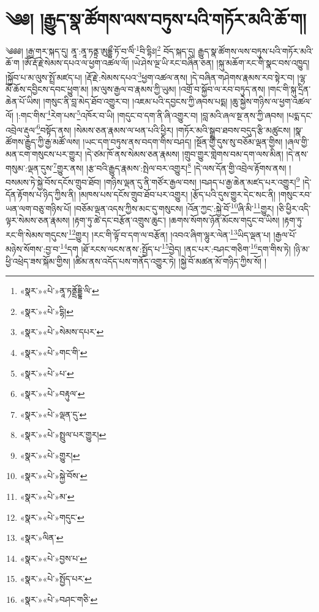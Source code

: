 \chapter{༄༅། །རྒྱུད་སྣ་ཚོགས་ལས་བཏུས་པའི་གཏོར་མའི་ཆོ་ག།}༄༅༅། །རྒྱ་གར་སྐད་དུ། ནཱ་:ནཱ་ཏནྟྲ་ཨུདྡྷྲྀ་ཏོ་བ་ལིཾ་\footnote{«སྣར་»«པེ་»ནཱ་ཏནྡྲོདྡྷི་ལི་}བི་དྷིཿ།\footnote{«སྣར་»«པེ་»དྷི།} བོད་སྐད་དུ། རྒྱུད་སྣ་ཚོགས་ལས་བཏུས་པའི་གཏོར་མའི་ཆོ་ག །ཨོཾ་རྡོ་རྗེ་སེམས་དཔའ་ལ་ཕྱག་འཚལ་ལོ། །ཡེ་ཤེས་ལྔ་ཡི་རང་བཞིན་ཅན། །སྐུ་མཆོག་རང་གི་སྣང་བས་འཁྱུད། །སྐྱོབ་པ་མ་ལུས་སྤྲོ་མཛད་པ། །རྡོ་རྗེ་:སེམས་དཔའ་\footnote{«སྣར་»«པེ་»སེམས་དཔར་}ཕྱག་འཚལ་ནས། །དེ་བཞིན་གཤེགས་རྣམས་རབ་སྟེར་བ། །ལྷ་མོ་ཆོས་དབྱིངས་དབང་ཕྱུག་མ། །མ་ལུས་རྒྱལ་བ་རྣམས་ཀྱི་ཡུམ། །འགྲོ་བ་སྐྱོབ་ལ་རབ་བཏུད་ནས། །གང་གི་སྐུ་དྲིན་ཆེན་པོ་ཡིས། །གསུང་ནི་བླ་མེད་ཐོབ་འགྱུར་བ། །འཇམ་པའི་དབྱངས་ཀྱི་ཞབས་པདྨ། །ཆུ་སྐྱེས་གཉིས་ལ་ཕྱག་འཚལ་ལོ། །:གང་གིས་\footnote{«སྣར་»«པེ་»གང་གི་}རེག་པས་\footnote{«སྣར་»«པེ་»པ་}འཁོར་བ་ཡི། །གདུང་བ་དག་ནི་ཞི་འགྱུར་བ། །བླ་མའི་ཞལ་སྔ་ནས་ཀྱི་ཞབས། །པདྨ་དང་འབྲེལ་རྡུལ་\footnote{«སྣར་»«པེ་»བརྟུལ་}བསྟོད་ནས། །སེམས་ཅན་རྣམས་ལ་ཕན་པའི་ཕྱིར། །གཏོར་མའི་སྒྲུབ་ཐབས་བདུད་རྩི་མཚུངས། །སྣ་ཚོགས་རྒྱུད་ཀྱི་རྒྱ་མཚོ་ལས། །ཡང་དག་བཏུས་ནས་བདག་གིས་བཤད། །སྔོན་གྱི་དུས་སུ་བཅོམ་ལྡན་གྱིས། །ཞལ་གྱི་མན་ངག་གསུངས་པར་གྱུར། །དེ་ཙམ་ཁོ་ནས་སེམས་ཅན་རྣམས། །གྲུབ་གྱུར་གླེགས་བམ་དག་ལས་མིན། །དེ་ནས་གསུམ་:ལྡན་དུས་\footnote{«སྣར་»«པེ་»ལྡན་དུ་}གྱུར་ནས། །རྩ་བའི་རྒྱུད་རྣམས་:སྤེལ་བར་འགྱུར།\footnote{«སྣར་»«པེ་»སྤྲུལ་པར་གྱུར།} །དེ་ལས་དོན་གྱི་འབྲེལ་རྟོགས་ནས། །བསམས་ཏེ་སྐྱེ་བོས་དངོས་གྲུབ་ཐོབ། །གཉིས་ལྡན་དུ་ནི་གཙོར་རྒྱལ་བས། །བཤད་པ་རྒྱ་ཆེན་མཛད་པར་འགྱུར།\footnote{«སྣར་»«པེ་»གྱུར།} །དེ་དོན་རྟོགས་པ་ཉིད་ཀྱིས་ནི། །མཁས་པས་དངོས་གྲུབ་ཐོབ་པར་འགྱུར། །རྩོད་པའི་དུས་གྱུར་དེང་སང་ནི། །གསུང་རབ་ཡན་ལག་བཅུ་གཉིས་པོ། །བཅོམ་ལྡན་འདས་ཀྱིས་མང་དུ་གསུངས། །འོན་ཀྱང་:སྐྱེ་བོ་\footnote{«སྣར་»«པེ་»སྐྱེ་བོས་}ཞི་མི་\footnote{«སྣར་»«པེ་»མ་}གྱུར། །ཅི་ཕྱིར་འདི་ལྟར་སེམས་ཅན་རྣམས། །རྟག་ཏུ་ཚེ་དང་བརྩོན་འགྲུས་ཆུང་། །ཆགས་སོགས་ཉོན་མོངས་གདུང་བ་ཡིས། །རྟག་ཏུ་རང་གི་སེམས་གདུངས་\footnote{«སྣར་»«པེ་»གདུང་}གྱུར། །རང་གི་ལྟོ་བ་དག་ལ་བརྩོན། །འབའ་ཞིག་ལྷུར་ལེན་\footnote{«སྣར་»ལིན་}ཡིད་ལྡན་པ། །རྒྱལ་པོ་མཉེས་སོགས་:བྱ་བ་\footnote{«སྣར་»«པེ་»བྱས་པ་}དག །ཐོ་རངས་ལངས་ནས་:སྤྱོད་པ་\footnote{«སྣར་»«པེ་»སྤྱོད་པར་}བྱེད། །ནང་པར་:བཤང་གཅིག་\footnote{«སྣར་»«པེ་»བཤང་གཅི་}དག་གིས་ཏེ། །ཉི་མ་ཕྱི་འཕྲེད་ཟས་སྐོམ་གྱིས། །ཚིམ་ནས་འདོད་པས་གནོད་འགྱུར་ཏེ། །སྐྱེ་བོ་མཚན་མོ་གཉིད་ཀྱིས་སོ། །
